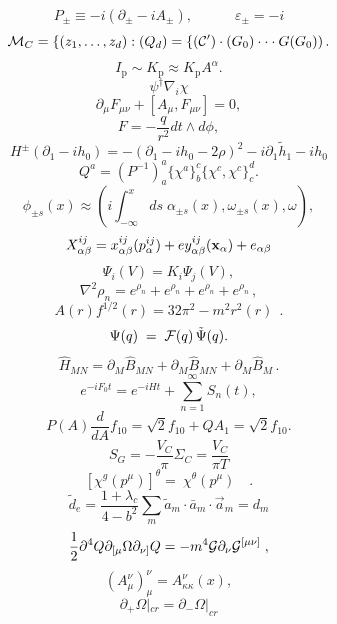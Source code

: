 \documentclass{article}
\begin{document}
$$P _ { \pm } \equiv - i ( \partial _ { \pm } - i A _ { \pm } ) , \quad \qquad \varepsilon _ { \pm } = - i$$
$${ \cal M } _ { C } = \{ ( z _ { 1 } , \ldots , z _ { d } ) : ( Q _ { d } ) = \{ ( { \cal C } ^ { \prime } ) \cdot ( G _ { 0 } ) \cdot \cdot \cdot G ( G _ { 0 } ) ) \, .$$
$$I _ { \mathrm { p } } \sim K _ { \mathrm { p } } \approx K _ { \mathrm { p } } A ^ { \alpha } .$$
$$\psi ^ { \dagger } \nabla _ { i } \chi$$
$$\partial _ { \mu } F _ { \mu \nu } + [ A _ { \mu } , F _ { \mu \nu } ] = 0 ,$$
$$F = - \frac { q } { r ^ { 2 } } d t \wedge d \phi ,$$
$$H ^ { \pm } ( \partial _ { 1 } - i h _ { 0 } ) = - ( \partial _ { 1 } - i h _ { 0 } - 2 \rho ) ^ { 2 } - i \partial _ { 1 } \tilde { h } _ { 1 } - i h _ { 0 }$$
$$Q ^ { a } = ( P ^ { - 1 } ) _ { a } ^ { a } \{ \chi ^ { a } \} _ { b } ^ { c } \{ \chi ^ { c } , \chi ^ { c } \} _ { c } ^ { d } .$$
$$\phi _ { \pm s } ( x ) \approx \left ( i \int _ { - \infty } ^ { x } d s \; \alpha _ { \pm s } ( x ) , \omega _ { \pm s } ( x ) , \omega \right ) ,$$
$$X _ { \alpha \beta } ^ { i j } = x _ { \alpha \beta } ^ { i j } ( p _ { \alpha } ^ { i j } ) + e y _ { \alpha \beta } ^ { i j } ( { \bf x } _ { \alpha } ) + e _ { \alpha \beta }$$
$$\Psi _ { i } ( V ) = K _ { i } \Psi _ { j } ( V ) ,$$
$$\nabla ^ { 2 } \rho _ { n } = e ^ { \rho _ { n } } + e ^ { \rho _ { n } } + e ^ { \rho _ { n } } + e ^ { \rho _ { n } } \, ,$$
$$A ( r ) f ^ { 1 / 2 } ( r ) = 3 2 \pi ^ { 2 } - m ^ { 2 } r ^ { 2 } ( r ) ~ ~ .$$
$$\Psi ( q ) \; = \; { \cal F } ( q ) \, \tilde { \Psi } ( q ) .$$
$$\hat { H } _ { M N } = \partial _ { M } \hat { B } _ { M N } + \partial _ { M } \hat { B } _ { M N } + \partial _ { M } \hat { B } _ { M } \, .$$
$$e ^ { - i F _ { 0 } t } = e ^ { - i H t } + \sum _ { n = 1 } ^ { \infty } S _ { n } ( t ) ,$$
$$P ( A ) \frac { d } { d A } f _ { 1 0 } = \sqrt { 2 } f _ { 1 0 } + Q A _ { 1 } = \sqrt { 2 } f _ { 1 0 } .$$
$$S _ { G } = - \frac { V _ { C } } { \pi } \Sigma _ { C } = \frac { V _ { C } } { \pi T }$$
$$\left [ \chi ^ { g } ( p ^ { \mu } ) \right ] ^ { \theta } = \ \chi ^ { \theta } ( p ^ { \mu } ) \quad .$$
$$\tilde { d } _ { e } = { \frac { 1 + \lambda _ { c } } { 4 - b ^ { 2 } } } \sum _ { m } \tilde { a } _ { m } \cdot \bar { a } _ { m } \cdot \vec { a } _ { m } = d _ { m }$$
$$\frac { 1 } { 2 } \partial ^ { 4 } Q \partial _ { [ \mu } \Omega \partial _ { \nu ] } Q = - m ^ { 4 } { \cal G } \partial _ { \nu } { \cal G } ^ { [ \mu \nu ] } \; ,$$
$$( A _ { \mu } ^ { \nu } ) _ { \mu } ^ { \nu } = A _ { \kappa \kappa } ^ { \nu } ( x ) ,$$
$$\partial _ { + } \Omega | _ { c r } = \partial _ { - } \Omega | _ { c r }$$
\end{document}
